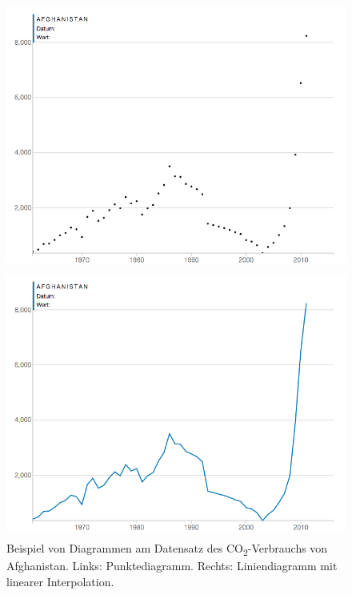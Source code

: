 \begin{figure}[!htbp]
	\centering
	\begin{minipage}{0.45\textwidth}
		\centering
		\includegraphics[width=\linewidth]{images/scatterplot_no_interpolation}
	\end{minipage}\hfill
	\begin{minipage}{0.45\textwidth}
		\centering
		\includegraphics[width=\linewidth]{images/scatterplot_interpolated}
	\end{minipage}
	\caption[Vergleich zwischen Punktediagramm und Liniendiagramm]{Beispiel von Diagrammen am Datensatz des CO\textsubscript{2}-Verbrauchs von Afghanistan. Links: Punktediagramm. Rechts: Liniendiagramm mit linearer Interpolation.}
	\label{fig:scatterplot}
\end{figure}

